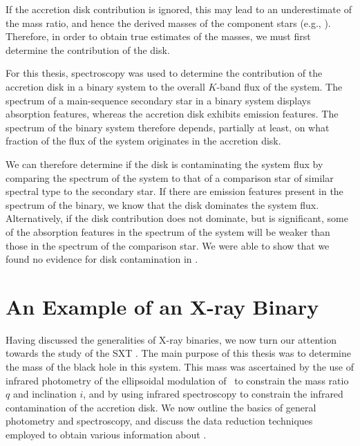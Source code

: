 \vspace{\myparskip}

If the accretion disk contribution is ignored, this may lead to an underestimate of the
mass ratio, and hence the derived masses of the component stars (e.g., %
%
). Therefore, in order to obtain true estimates of the masses, we must
first determine the contribution of the disk. %

\vspace{\myparskip}

For this thesis, spectroscopy was used to determine the contribution
of the accretion disk in a binary system to the overall $K$-band flux of the
system. The spectrum of a main-sequence secondary star in a binary
system displays absorption features, whereas the accretion disk
exhibits emission features. The spectrum of the binary system
therefore depends, partially at least, on what fraction of the flux of the system
originates in the accretion disk. %

\vspace{\myparskip}

We can therefore determine if the disk is contaminating the system
flux by comparing the spectrum of the system to that of a comparison star of
similar spectral type to the secondary star. If there are emission
features present in the spectrum of the binary, we know that the disk
dominates the system flux. Alternatively, if the disk contribution
does not dominate, but is significant, some of the absorption features
in the spectrum of the system will be weaker than those in the
spectrum of the comparison star. We were able to show that we found no evidence for disk contamination in \groj. %


\section{An Example of an X-ray Binary}\label{cha:Introduction:sec:AnExampleOfAnX-rayBinary}

Having discussed the generalities of X-ray binaries, we now turn our attention towards the study of the SXT \groj. The main purpose of this thesis was to determine the mass of the black hole in this system. This mass was ascertained by the use of infrared photometry of the ellipsoidal modulation of \groj\ to constrain the mass ratio $q$ and inclination $i$, and by using infrared spectroscopy to constrain the infrared contamination of the accretion disk. We now outline the basics of general photometry and spectroscopy, and discuss the data reduction techniques employed to obtain various information about \groj.

